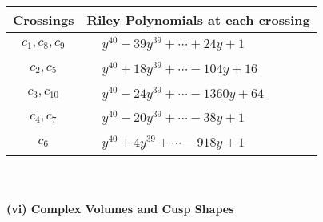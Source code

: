\documentclass[1p]{elsarticle_modified}
\theoremstyle{definition}
\begin{document}
\begin{tabular}{m{50pt}|m{274pt}}
Crossings & \hspace{64pt}Riley Polynomials at each crossing \\
\hline $$\begin{aligned}c_{1},c_{8},c_{9}\end{aligned}$$&$\begin{aligned}
&y^{40}-39 y^{39}+\cdots+24 y+1
\end{aligned}$\\
\hline $$\begin{aligned}c_{2},c_{5}\end{aligned}$$&$\begin{aligned}
&y^{40}+18 y^{39}+\cdots-104 y+16
\end{aligned}$\\
\hline $$\begin{aligned}c_{3},c_{10}\end{aligned}$$&$\begin{aligned}
&y^{40}-24 y^{39}+\cdots-1360 y+64
\end{aligned}$\\
\hline $$\begin{aligned}c_{4},c_{7}\end{aligned}$$&$\begin{aligned}
&y^{40}-20 y^{39}+\cdots-38 y+1
\end{aligned}$\\
\hline $$\begin{aligned}c_{6}\end{aligned}$$&$\begin{aligned}
&y^{40}+4 y^{39}+\cdots-918 y+1
\end{aligned}$\\
\hline
\end{tabular}\\~\\
\newpage\flushleft \textbf{(vi) Complex Volumes and Cusp Shapes}
\end{document}
